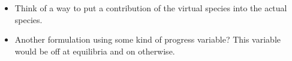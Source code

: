 \begin{tcolorbox}[arc is angular, title=Some thoughts...]
  \begin{itemize}
    \item Think of a way to put a contribution of the 
          virtual species into the actual species.
    \item Another formulation using some kind of progress 
          variable?  This variable would be off at 
          equilibria and on otherwise.
  \end{itemize}
\end{tcolorbox}
